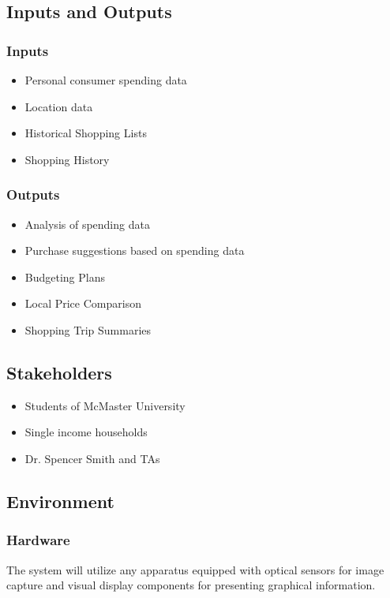 \documentclass{article}
\begin{document}
\subsection{Inputs and Outputs}

\subsubsection{Inputs}
    \begin{itemize}
        \item Personal consumer spending data
        \item Location data
        \item Historical Shopping Lists
        \item Shopping History
    \end{itemize}

\subsubsection{Outputs}
    \begin{itemize}
        \item Analysis of spending data
        \item Purchase suggestions based on spending data
        \item Budgeting Plans
        \item Local Price Comparison
        \item Shopping Trip Summaries
    \end{itemize}

\subsection{Stakeholders}

\begin{itemize}
    \item Students of McMaster University
    \item Single income households
    \item Dr. Spencer Smith and TAs
\end{itemize}

\subsection{Environment}

\subsubsection{Hardware} 
The system will utilize any apparatus equipped with optical sensors for image capture and visual display components for presenting graphical information.
\end{document}
